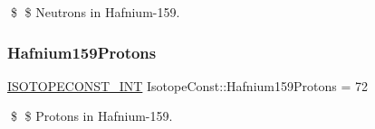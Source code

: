\$ \$ Neutrons in Hafnium-\/159. \mbox{\label{group___isotope_const-_hafnium-_hf159_gaac022a447d3fef4f0748291a81256630}} 
\subsubsection{\texorpdfstring{Hafnium159\+Protons}{Hafnium159Protons}}
{\footnotesize\ttfamily \mbox{\hyperlink{group___isotope_const-_macros_ga5f18360b3e99483a35c32d789e62621c}{I\+S\+O\+T\+O\+P\+E\+C\+O\+N\+S\+T\+\_\+\+I\+NT}} Isotope\+Const\+::\+Hafnium159\+Protons = 72}

\$ \$ Protons in Hafnium-\/159. 